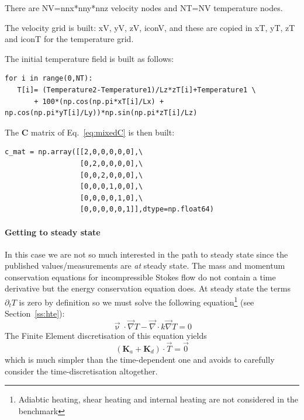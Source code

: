 There are NV=nnx*nny*nnz velocity nodes and NT=NV temperature nodes.

The velocity grid is built: xV, yV, zV, iconV, and 
these are copied in xT, yT, zT and iconT for the temperature grid.  

The initial temperature field is built as follows:
\begin{lstlisting}
for i in range(0,NT):
   T[i]= (Temperature2-Temperature1)/Lz*zT[i]+Temperature1 \
       + 100*(np.cos(np.pi*xT[i]/Lx) + np.cos(np.pi*yT[i]/Ly))*np.sin(np.pi*zT[i]/Lz)
\end{lstlisting}

The ${\bm C}$ matrix of Eq.~\ref{eq:mixedC} is then built:
\begin{lstlisting}
c_mat = np.array([[2,0,0,0,0,0],\
                  [0,2,0,0,0,0],\
                  [0,0,2,0,0,0],\
                  [0,0,0,1,0,0],\
                  [0,0,0,0,1,0],\
                  [0,0,0,0,0,1]],dtype=np.float64) 
\end{lstlisting}


\paragraph{Getting to steady state}  
In this case we are not so much interested in the path to steady state since 
the published values/measurements are {\it at} steady state.
The mass and momentum conservation equations for incompressible Stokes flow do not 
contain a time derivative but the energy conservation equation does. 
At steady state the terms $\partial_t T$ is zero by definition so we must solve
the following equation\footnote{Adiabtic heating, shear heating and internal heating are not considered
in the benchmark} (see Section~\ref{ss:hte}):
\begin{equation}
\vec{\upnu}\cdot\vec\nabla T - {\vec \nabla} \cdot k {\vec \nabla} T = 0
\end{equation}
The Finite Element discretisation of this equation yields 
\[
({\bm K}_a + {\bm K}_d) \cdot \vec{T} = \vec{0}
\]
which is much simpler than the time-dependent one and avoids to carefully consider the 
time-discretisation altogether. 

